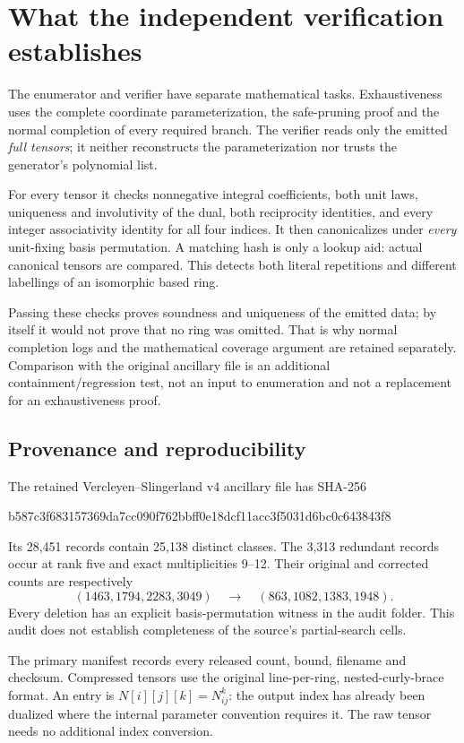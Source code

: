 \documentclass[11pt,a4paper]{article}
\theoremstyle{definition}\newtheorem{definition}[theorem]{Definition}\newtheorem{remark}[theorem]{Remark}
\begin{document}
\section{What the independent verification establishes}
The enumerator and verifier have separate mathematical tasks. Exhaustiveness
uses the complete coordinate parameterization, the safe-pruning proof and the
normal completion of every required branch. The verifier reads only the emitted
\emph{full tensors}; it neither reconstructs the parameterization nor trusts the
generator's polynomial list.

For every tensor it checks nonnegative integral coefficients, both unit laws,
uniqueness and involutivity of the dual, both reciprocity identities, and every
integer associativity identity for all four indices. It then canonicalizes
under \emph{every} unit-fixing basis permutation. A matching hash is only a
lookup aid: actual canonical tensors are compared. This detects both literal
repetitions and different labellings of an isomorphic based ring.

Passing these checks proves soundness and uniqueness of the emitted data; by
itself it would not prove that no ring was omitted. That is why normal completion
logs and the mathematical coverage argument are retained separately. Comparison
with the original ancillary file is an additional containment/regression test,
not an input to enumeration and not a replacement for an exhaustiveness proof.

\subsection{Provenance and reproducibility}
The retained Vercleyen--Slingerland v4 ancillary file has SHA-256
\begin{center}\footnotesize\ttfamily
b587c3f683157369da7cc090f762bbff0e18dcf11acc3f5031d6bc0c643843f8
\end{center}
Its 28,451 records contain 25,138 distinct classes. The 3,313 redundant records
occur at rank five and exact multiplicities 9--12. Their original and corrected
counts are respectively
\[
(1463,1794,2283,3049)\quad\longrightarrow\quad(863,1082,1383,1948).
\]
Every deletion has an explicit basis-permutation witness in the audit folder.
This audit does not establish completeness of the source's partial-search cells.

The primary manifest  records every released count,
bound, filename and checksum. Compressed tensors use the original line-per-ring,
nested-curly-brace format. An entry is $N[i][j][k]=N_{ij}^{k}$: the output index
has already been dualized where the internal parameter convention requires it.
The raw tensor needs no additional index conversion.
\end{document}
